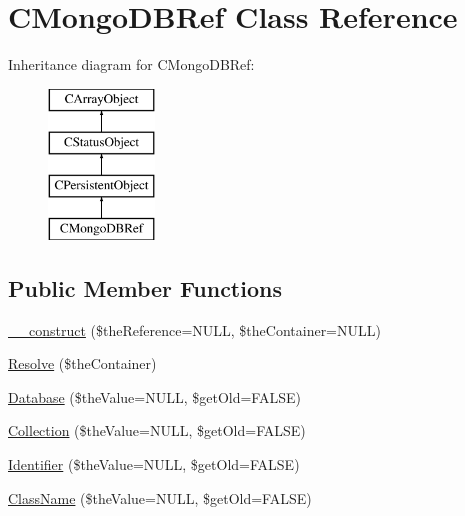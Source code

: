\hypertarget{class_c_mongo_d_b_ref}{\section{C\-Mongo\-D\-B\-Ref Class Reference}
\label{class_c_mongo_d_b_ref}
}
Inheritance diagram for C\-Mongo\-D\-B\-Ref\-:\begin{figure}[H]
\begin{center}
\leavevmode
\includegraphics[height=4.000000cm]{class_c_mongo_d_b_ref}
\end{center}
\end{figure}
\subsection*{Public Member Functions}
\begin{DoxyCompactItemize}
\item 
\hyperlink{class_c_mongo_d_b_ref_a13de8db465efc2ac47c38cfc36bce4b9}{\-\_\-\-\_\-construct} (\$the\-Reference=N\-U\-L\-L, \$the\-Container=N\-U\-L\-L)
\item 
\hyperlink{class_c_mongo_d_b_ref_aa7696f05d8742a465b254c8822e69c09}{Resolve} (\$the\-Container)
\item 
\hyperlink{class_c_mongo_d_b_ref_a439141cc81915d0e585f1501813cff01}{Database} (\$the\-Value=N\-U\-L\-L, \$get\-Old=F\-A\-L\-S\-E)
\item 
\hyperlink{class_c_mongo_d_b_ref_ac7ce5aab506229ad1ebdd907e5978ef9}{Collection} (\$the\-Value=N\-U\-L\-L, \$get\-Old=F\-A\-L\-S\-E)
\item 
\hyperlink{class_c_mongo_d_b_ref_addd509a376ff9f56f318345027f4b807}{Identifier} (\$the\-Value=N\-U\-L\-L, \$get\-Old=F\-A\-L\-S\-E)
\item 
\hyperlink{class_c_mongo_d_b_ref_a8c1c4b44c33fc393ba75c9749921c509}{Class\-Name} (\$the\-Value=N\-U\-L\-L, \$get\-Old=F\-A\-L\-S\-E)
\end{DoxyCompactItemize}


